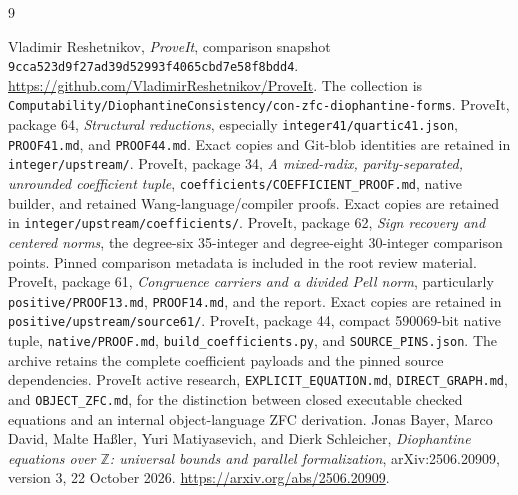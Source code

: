 \documentclass[11pt]{article}
\theoremstyle{remark}\newtheorem{remark}[theorem]{Remark}
\newcommand{\Z}{\mathbb Z}\newcommand{\Q}{\mathbb Q}\newcommand{\N}{\mathbb N}\newcommand{\Pos}{\operatorname{Pos}}\newcommand{\Cone}{\mathcal C}\newcommand{\Con}{\operatorname{Con}}
\newcommand{\repo}{\url{https://github.com/VladimirReshetnikov/ProveIt}}
\newcommand{\pin}{\nolinkurl{9cca523d9f27ad39d52993f4065cbd7e58f8bdd4}}
\begin{document}
\clearpage
\begin{thebibliography}{9}
\raggedright
{} Vladimir Reshetnikov, \emph{ProveIt}, comparison snapshot \pin. \repo. The collection is \texttt{Computability/DiophantineConsistency/con-zfc-diophantine-forms}.
 ProveIt, package 64, \emph{Structural reductions}, especially \texttt{integer41/quartic41.json}, \texttt{PROOF41.md}, and \texttt{PROOF44.md}. Exact copies and Git-blob identities are retained in \texttt{integer/upstream/}.
 ProveIt, package 34, \emph{A mixed-radix, parity-separated, unrounded coefficient tuple}, \texttt{coefficients/COEFFICIENT\_PROOF.md}, native builder, and retained Wang-language/compiler proofs. Exact copies are retained in \texttt{integer/upstream/coefficients/}.
 ProveIt, package 62, \emph{Sign recovery and centered norms}, the degree-six 35-integer and degree-eight 30-integer comparison points. Pinned comparison metadata is included in the root review material.
 ProveIt, package 61, \emph{Congruence carriers and a divided Pell norm}, particularly \texttt{positive/PROOF13.md}, \texttt{PROOF14.md}, and the report. Exact copies are retained in \texttt{positive/upstream/source61/}.
 ProveIt, package 44, compact 590069-bit native tuple, \texttt{native/PROOF.md}, \texttt{build\_coefficients.py}, and \texttt{SOURCE\_PINS.json}. The archive retains the complete coefficient payloads and the pinned source dependencies.
 ProveIt active research, \texttt{EXPLICIT\_EQUATION.md}, \texttt{DIRECT\_GRAPH.md}, and \texttt{OBJECT\_ZFC.md}, for the distinction between closed executable checked equations and an internal object-language ZFC derivation.
 Jonas Bayer, Marco David, Malte Ha\ss ler, Yuri Matiyasevich, and Dierk Schleicher, \emph{Diophantine equations over $\Z$: universal bounds and parallel formalization}, arXiv:2506.20909, version 3, 22 October 2026. \url{https://arxiv.org/abs/2506.20909}.
\end{thebibliography}
\end{document}
